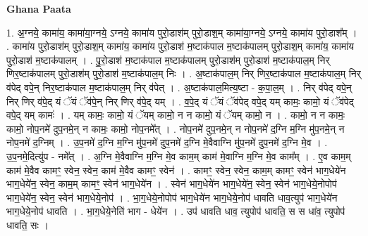\documentclass[17pt]{extarticle}
\begin{document}
\textbf{Ghana Paata } \newline

1. अ॒ग्नये॒ कामा॑य॒ कामा॑या॒ग्नये॒ ऽग्नये॒ कामा॑य पुरो॒डाश॑म् पुरो॒डाश॒म् कामा॑या॒ग्नये॒ ऽग्नये॒ कामा॑य पुरो॒डाश᳚म् । . कामा॑य पुरो॒डाश॑म् पुरो॒डाश॒म् कामा॑य॒ कामा॑य पुरो॒डाश॑ म॒ष्टाक॑पाल म॒ष्टाक॑पालम् पुरो॒डाश॒म् कामा॑य॒ कामा॑य पुरो॒डाश॑ म॒ष्टाक॑पालम् । . पु॒रो॒डाश॑ म॒ष्टाक॑पाल म॒ष्टाक॑पालम् पुरो॒डाश॑म् पुरो॒डाश॑ म॒ष्टाक॑पाल॒म् निर् णिर॒ष्टाक॑पालम् पुरो॒डाश॑म् पुरो॒डाश॑ म॒ष्टाक॑पाल॒म् निः । . अ॒ष्टाक॑पाल॒म् निर् णिर॒ष्टाक॑पाल म॒ष्टाक॑पाल॒म् निर् व॑पेद् वपे॒न् निर॒ष्टाक॑पाल म॒ष्टाक॑पाल॒म् निर् व॑पेत् । . अ॒ष्टाक॑पाल॒मित्य॒ष्टा - क॒पा॒ल॒म् । . निर् व॑पेद् वपे॒न् निर् णिर् व॑पे॒द् यं ॅयं ॅव॑पे॒न् निर् णिर् व॑पे॒द् यम् । . व॒पे॒द् यं ॅयं ॅव॑पेद् वपे॒द् यम् कामः॒ कामो॒ यं ॅव॑पेद् वपे॒द् यम् कामः॑ । . यम् कामः॒ कामो॒ यं ॅयम् कामो॒ न न कामो॒ यं ॅयम् कामो॒ न । . कामो॒ न न कामः॒ कामो॒ नोप॒नमे॑ दुप॒नमे॒न् न कामः॒ कामो॒ नोप॒नमे᳚त् । . नोप॒नमे॑ दुप॒नमे॒न् न नोप॒नमे॑ द॒ग्नि म॒ग्नि मु॑प॒नमे॒न् न नोप॒नमे॑ द॒ग्निम् । . उ॒प॒नमे॑ द॒ग्नि म॒ग्नि मु॑प॒नमे॑ दुप॒नमे॑ द॒ग्नि मे॒वैवाग्नि मु॑प॒नमे॑ दुप॒नमे॑ द॒ग्नि मे॒व । . उ॒प॒नमे॒दित्यु॑प - नमे᳚त् । . अ॒ग्नि मे॒वैवाग्नि म॒ग्नि मे॒व काम॒म् काम॑ मे॒वाग्नि म॒ग्नि मे॒व काम᳚म् । . ए॒व काम॒म् काम॑ मे॒वैव कामꣳ॒॒ स्वेन॒ स्वेन॒ काम॑ मे॒वैव कामꣳ॒॒ स्वेन॑ । . कामꣳ॒॒ स्वेन॒ स्वेन॒ काम॒म् कामꣳ॒॒ स्वेन॑ भाग॒धेये॑न भाग॒धेये॑न॒ स्वेन॒ काम॒म् कामꣳ॒॒ स्वेन॑ भाग॒धेये॑न । . स्वेन॑ भाग॒धेये॑न भाग॒धेये॑न॒ स्वेन॒ स्वेन॑ भाग॒धेये॒नोपोप॑ भाग॒धेये॑न॒ स्वेन॒ स्वेन॑ भाग॒धेये॒नोप॑ । . भा॒ग॒धेये॒नोपोप॑ भाग॒धेये॑न भाग॒धेये॒नोप॑ धावति धाव॒त्युप॑ भाग॒धेये॑न भाग॒धेये॒नोप॑ धावति । . भा॒ग॒धेये॒नेति॑ भाग - धेये॑न । . उप॑ धावति धाव॒ त्युपोप॑ धावति॒ स स धा॑व॒ त्युपोप॑ धावति॒ सः । \newline
\end{document}
